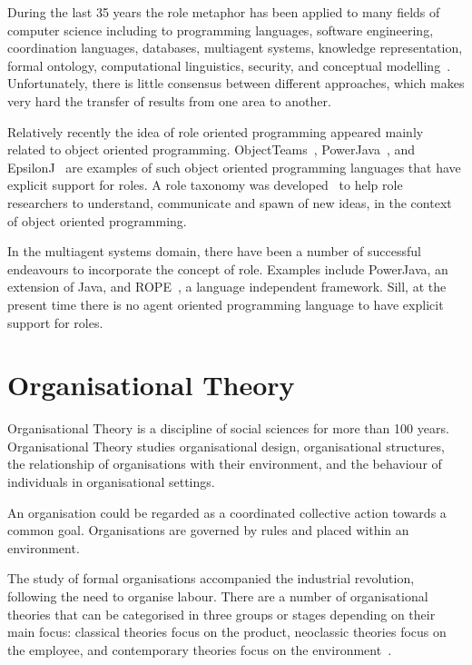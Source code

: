 \documentclass[a4paper,12pt,oneside,fleqn]{book} %
\begin{document}
During the last 35 years the role metaphor has been applied to many fields
of computer science including to programming languages, software
engineering, coordination languages, databases, multiagent systems,
knowledge representation, formal ontology, computational linguistics,
security, and conceptual modelling~\cite{DBLP:journals/ao/BoellaTV07}.
Unfortunately, there is little consensus between different approaches,
which makes very hard the transfer of results from one area to another.

Relatively recently the idea of role oriented programming appeared mainly
related to object oriented programming.
ObjectTeams~\cite{DBLP:journals/ao/Herrmann07},
PowerJava~\cite{DBLP:journals/entcs/BaldoniBT06}, and
EpsilonJ~\cite{DBLP:conf/snpd/MonpratarnchaiT08} are examples of such
object oriented programming languages that have explicit support for roles.
A role taxonomy was developed~\cite{graversen06nature} to help role
researchers to understand, communicate and spawn of new ideas, in the
context of object oriented programming.

In the multiagent systems domain, there have been a number of successful
endeavours to incorporate the concept of role. Examples include PowerJava,
an extension of Java, and ROPE~\cite{DBLP:conf/coopis/BechtGKM99}, a
language independent framework.  Sill, at the present time there is no
agent oriented programming language to have explicit support for roles.


\section{Organisational Theory}  %

Organisational Theory is a discipline of social sciences for more than 100
years. Organisational Theory studies organisational design, organisational
structures, the relationship of organisations with their environment, and
the behaviour of individuals in organisational settings.

An organisation could be regarded as a coordinated collective action
towards a common goal. Organisations are governed by rules and placed
within an environment.

The study of formal organisations accompanied the industrial
revolution, following the need to organise labour. There are a number of
organisational theories that can be categorised in three groups or stages
depending on their main focus: classical theories focus on the product,
neoclassic theories focus on the employee, and contemporary theories focus
on the environment~\cite{DohertySD01}.
\end{document}
